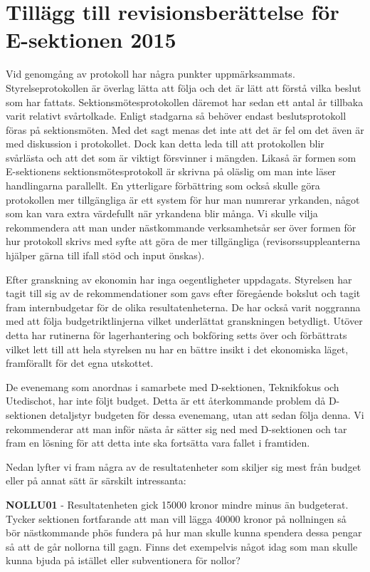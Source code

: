 \documentclass[../_main/handlingar.tex]{subfiles}
\begin{document}
\section{Tillägg till revisionsberättelse för E-sektionen 2015}
Vid genomgång av protokoll har några punkter uppmärksammats. Styrelseprotokollen är överlag lätta att följa och det är lätt att förstå vilka beslut som har fattats. Sektionsmötesprotokollen däremot har sedan ett antal år tillbaka varit relativt svårtolkade. Enligt stadgarna så behöver endast beslutsprotokoll föras på sektionsmöten. Med det sagt menas det inte att det är fel om det även är med diskussion i protokollet. Dock kan detta leda till att protokollen blir svårlästa och att det som är viktigt försvinner i mängden. Likaså är formen som E-sektionens sektionsmötesprotokoll är skrivna på oläslig om man inte läser handlingarna parallellt. En ytterligare förbättring som också skulle göra protokollen mer tillgängliga är ett system för hur man numrerar yrkanden, något som kan vara extra värdefullt när yrkandena blir många. Vi skulle vilja rekommendera att man under nästkommande verksamhetsår ser över formen för hur protokoll skrivs med syfte att göra de mer tillgängliga (revisorssuppleanterna hjälper gärna till ifall stöd och input önskas).

Efter granskning av ekonomin har inga oegentligheter uppdagats. Styrelsen har tagit till sig av de rekommendationer som gavs efter föregående bokslut och tagit fram internbudgetar för de olika resultatenheterna. De har också varit noggranna med att följa budgetriktlinjerna vilket underlättat granskningen betydligt. Utöver detta har rutinerna för lagerhantering och bokföring setts över och förbättrats vilket lett till att hela styrelsen nu har en bättre insikt i det ekonomiska läget, framförallt för det egna utskottet.

De evenemang som anordnas i samarbete med D-sektionen, Teknikfokus och Utedischot, har inte följt budget. Detta är ett återkommande problem då D-sektionen detaljstyr budgeten för dessa evenemang, utan att sedan följa denna. Vi rekommenderar att man inför nästa år sätter sig ned med D-sektionen och tar fram en lösning för att detta inte ska fortsätta vara fallet i framtiden.

Nedan lyfter vi fram några av de resultatenheter som skiljer sig mest från budget eller på annat sätt är särskilt intressanta:

\textbf{NOLLU01} - Resultatenheten gick 15000 kronor mindre minus än budgeterat. Tycker sektionen fortfarande att man vill lägga 40000 kronor på nollningen så bör nästkommande phös fundera på hur man skulle kunna spendera dessa pengar så att de går nollorna till gagn. Finns det exempelvis något idag som man skulle kunna bjuda på istället eller subventionera för nollor?
\end{document}
